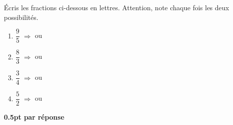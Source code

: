 
\question[4]
Écris les fractions ci-dessous en lettres. Attention, note chaque fois les deux possibilités.

\vspace{10pt}
\begin{enumerate}[leftmargin=*,align=parleft, label=\alph*), itemsep=25pt]
\item $\dfrac{9}{5}$ \quad $\Longrightarrow$ \quad {} \quad ou \quad {}
\item $\dfrac{8}{3}$ \quad $\Longrightarrow$ \quad {} \quad ou \quad {}
\item $\dfrac{3}{4}$ \quad $\Longrightarrow$ \quad {} \quad ou \quad {}
\item $\dfrac{5}{2}$ \quad $\Longrightarrow$ \quad {} \quad ou \quad {}
\end{enumerate}

\begin{solution}[0pt]
\textbf{0.5pt par réponse}
\end{solution}